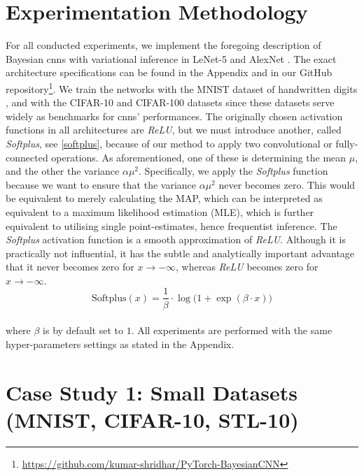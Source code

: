 \section{Experimentation Methodology} \label{experiments}
For all conducted experiments, we implement the foregoing description of Bayesian \acp{cnn} with variational inference in LeNet-5 \cite{lecun1998gradient} and AlexNet \cite{krizhevsky2012imagenet}. The exact architecture specifications can be found in the Appendix and in our GitHub repository\footnote{\url{https://github.com/kumar-shridhar/PyTorch-BayesianCNN}}.
We train the networks with the MNIST dataset of handwritten digits \cite{lecun1998gradient}, and with the CIFAR-10 and CIFAR-100 datasets \cite{krizhevsky2009learning} since these datasets serve widely as benchmarks for \acp{cnn}' performances. The originally chosen activation functions in all architectures are \textit{ReLU}, but we must introduce another, called \textit{Softplus}, see \eqref{softplus}, because of our method to apply two convolutional or fully-connected operations. As aforementioned, one of these is determining the mean $\mu$, and the other the variance $\alpha \mu^2$. Specifically, we apply the \textit{Softplus} function because we want to ensure that the variance $\alpha \mu^2$ never becomes zero. This would be equivalent to merely calculating the MAP, which can be interpreted as equivalent to a maximum likelihood estimation (MLE), which is further equivalent to utilising single point-estimates, hence frequentist inference. The \textit{Softplus} activation function is a smooth approximation of \textit{ReLU}. Although it is practically not influential, it has the subtle and analytically important advantage that it never becomes zero for $x \rightarrow -\infty$, whereas \textit{ReLU} becomes zero for $x \rightarrow -\infty$.
\\ 
\begin{equation}\label{softplus}
     \text{Softplus}(x) = \frac{1}{\beta} \cdot \log \big ( 1 + \exp(\beta \cdot x) \big )
\end{equation}
\\
where $\beta$ is by default set to $1$.
\newline All experiments are performed with the same hyper-parameters settings as stated in the Appendix.

\section{Case Study 1: Small Datasets (MNIST, CIFAR-10, STL-10)}
